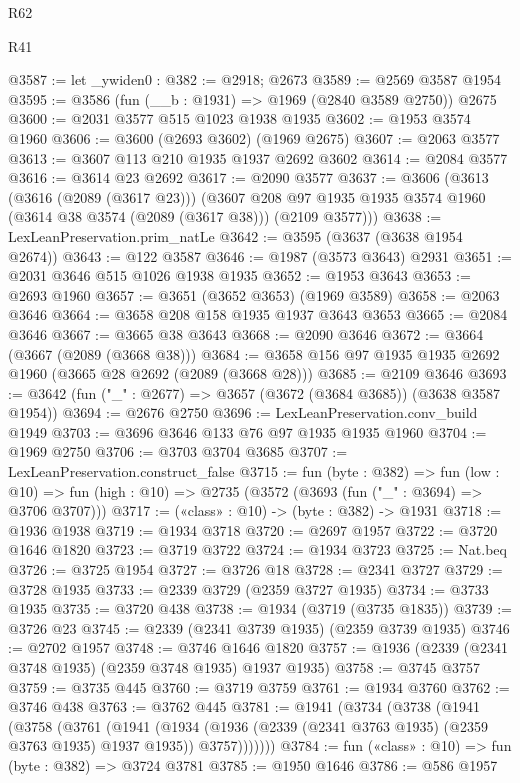\begin{lexlean}{R62}
\begin{lexlean}{R41}
\begin{coremodule}
{{{{{{{{{{{{{{{{{{{{{{{{{{{{{{{{{{{{{{{{{{{{{{{{{{{{{{{{{{{{{{{{{{{{{{{{{{{{{{{{{{{{{{{@3587 := let _ywiden0 : @382 := @2918; @2673
@3589 := @2569 @3587 @1954
@3595 := @3586 (fun (__b : @1931) => @1969 (@2840 @3589 @2750)) @2675
@3600 := @2031 @3577 @515 @1023 @1938 @1935
@3602 := @1953 @3574 @1960
@3606 := @3600 (@2693 @3602) (@1969 @2675)
@3607 := @2063 @3577
@3613 := @3607 @113 @210 @1935 @1937 @2692 @3602
@3614 := @2084 @3577
@3616 := @3614 @23 @2692
@3617 := @2090 @3577
@3637 := @3606
    (@3613
      (@3616 (@2089 (@3617 @23)))
      (@3607 @208 @97 @1935 @1935 @3574 @1960 (@3614 @38 @3574 (@2089 (@3617 @38))) (@2109 @3577)))
@3638 := LexLeanPreservation.prim_natLe
@3642 := @3595 (@3637 (@3638 @1954 @2674))
@3643 := @122 @3587
@3646 := @1987 (@3573 @3643) @2931
@3651 := @2031 @3646 @515 @1026 @1938 @1935
@3652 := @1953 @3643
@3653 := @2693 @1960
@3657 := @3651 (@3652 @3653) (@1969 @3589)
@3658 := @2063 @3646
@3664 := @3658 @208 @158 @1935 @1937 @3643 @3653
@3665 := @2084 @3646
@3667 := @3665 @38 @3643
@3668 := @2090 @3646
@3672 := @3664 (@3667 (@2089 (@3668 @38)))
@3684 := @3658 @156 @97 @1935 @1935 @2692 @1960 (@3665 @28 @2692 (@2089 (@3668 @28)))
@3685 := @2109 @3646
@3693 := @3642 (fun ("_" : @2677) => @3657 (@3672 (@3684 @3685)) (@3638 @3587 @1954))
@3694 := @2676 @2750
@3696 := LexLeanPreservation.conv_build @1949
@3703 := @3696 @3646 @133 @76 @97 @1935 @1935 @1960
@3704 := @1969 @2750
@3706 := @3703 @3704 @3685
@3707 := LexLeanPreservation.construct_false
@3715 := fun (byte : @382) =>
  fun (low : @10) => fun (high : @10) => @2735 (@3572 (@3693 (fun ("_" : @3694) => @3706 @3707)))
@3717 := («class» : @10) -> (byte : @382) -> @1931
@3718 := @1936 @1938
@3719 := @1934 @3718
@3720 := @2697 @1957
@3722 := @3720 @1646 @1820
@3723 := @3719 @3722
@3724 := @1934 @3723
@3725 := Nat.beq
@3726 := @3725 @1954
@3727 := @3726 @18
@3728 := @2341 @3727
@3729 := @3728 @1935
@3733 := @2339 @3729 (@2359 @3727 @1935)
@3734 := @3733 @1935
@3735 := @3720 @438
@3738 := @1934 (@3719 (@3735 @1835))
@3739 := @3726 @23
@3745 := @2339 (@2341 @3739 @1935) (@2359 @3739 @1935)
@3746 := @2702 @1957
@3748 := @3746 @1646 @1820
@3757 := @1936 (@2339 (@2341 @3748 @1935) (@2359 @3748 @1935) @1937 @1935)
@3758 := @3745 @3757
@3759 := @3735 @445
@3760 := @3719 @3759
@3761 := @1934 @3760
@3762 := @3746 @438
@3763 := @3762 @445
@3781 := @1941
    (@3734
      (@3738
        (@1941
          (@3758
            (@3761
              (@1941
                (@1934
                  (@1936 (@2339 (@2341 @3763 @1935) (@2359 @3763 @1935) @1937 @1935))
                  @3757)))))))
@3784 := fun («class» : @10) => fun (byte : @382) => @3724 @3781
@3785 := @1950 @1646
@3786 := @586 @1957
}}}}}}}}}}}}}}}}}}}}}}}}}}}}}}}}}}}}}}}}}}}}}}}}}}}}}}}}}}}}}}}}}}}}}}}}}}}}}}}}}}}}}}}
\end{coremodule}
\end{lexlean}
\end{lexlean}

